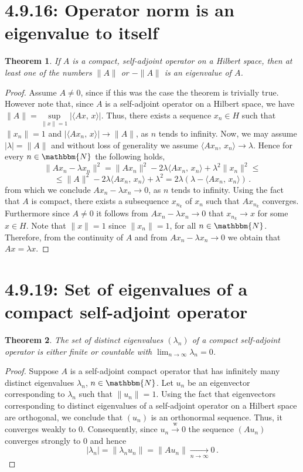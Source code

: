 \documentclass[12pt, a4paper]{article}
\newcommand{\N}{\ensuremath{\mathbbm{N}}}
\newtheorem{theorem}{Theorem}[section]
\begin{document}
\section{4.9.16: Operator norm is an eigenvalue to itself}
\begin{theorem}
If $A$ is a compact, self-adjoint operator on a Hilbert space, then at least one of the numbers $\|A\|$ or $-\|A\|$ is an eigenvalue of $A$.
\end{theorem}
\begin{proof}
Assume $A\neq 0$, since if this was the case the theorem is trivially true. However note that, since $A$ is a self-adjoint operator on a Hilbert space, we have $\|A\|=\underset{\|x\|=1}{\operatorname{sup}}|\langle Ax,\,x\rangle|$. Thus, there exists a sequence $x_n\in H$ such that $\|x_n\|=1$ and $|\langle Ax_n,\,x\rangle|\to \|A\|$, as $n$ tends to infinity. Now, we may assume $|\lambda|=\|A\|$ and without loss of generality we assume $\langle Ax_n,\,x_n\rangle\to\lambda$. Hence for every $n\in\N$ the following holds,
\[
    \|Ax_n-\lambda x_n\|^2=\|Ax_n\|^2-2\lambda\langle Ax_n,\,x_n\rangle+\lambda^2\|x_n\|^2\leq
\]
\[
    \leq \|A\|^2-2\lambda\langle Ax_n,\,x_n\rangle+\lambda^2=2\lambda(\lambda-\langle Ax_n,\,x_n\rangle)\,.
\]
from which we conclude $Ax_n-\lambda x_n\to0$, as $n$ tends to infinity. Using the fact that $A$ is compact, there exists a subsequence $x_{n_k}$ of $x_n$ such that $Ax_{n_k}$ converges. Furthermore since $A\neq 0$ it follows from $Ax_n-\lambda x_n\to0$ that $x_{n_k}\to x$ for some $x\in H$. Note that $\|x\|=1$ since $\|x_n\|=1$, for all $n\in\N$. Therefore, from the continuity of $A$ and from $Ax_n-\lambda x_n\to0$ we obtain that $Ax=\lambda x$. 
\end{proof}

\section{4.9.19: Set of eigenvalues of a compact self-adjoint operator}
\begin{theorem}
The set of distinct eigenvalues $(\lambda_n)$ of a compact self-adjoint operator is either finite or countable with $\lim_{n\to\infty}\lambda_n=0$.
\end{theorem}
\begin{proof}
Suppose $A$ is a self-adjoint compact operator that has infinitely many distinct eigenvalues $\lambda_n$, $n\in\N$. Let $u_n$ be an eigenvector corresponding to $\lambda_n$ such that $\|u_n\|=1$. Using the fact that eigenvectors corresponding to distinct eigenvalues of a self-adjoint operator on a Hilbert space are orthogonal, we conclude that $(u_n)$ is an orthonormal sequence. Thus, it converges weakly to $0$. Consequently, since $u_n\overset{\text{w}}{\to}0$ the sequence $(Au_n)$ converges strongly to $0$ and hence
\[
    |\lambda_n|=\|\lambda_nu_n\|=\|Au_n\|\underset{n\to\infty}{\longrightarrow}0\,.
\]
\end{proof}
\end{document}
